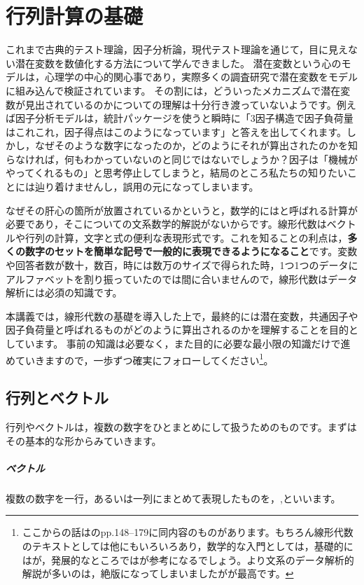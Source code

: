 \documentclass{ltjsbook}
\begin{document}
 
\chapter{行列計算の基礎} 
\label{chapter6} 
これまで古典的テスト理論，因子分析論，現代テスト理論を通じて，目に見えない潜在変数を数値化する方法について学んできました。
潜在変数という心のモデルは，心理学の中心的関心事であり，実際多くの調査研究で潜在変数をモデルに組み込んで検証されています。
その割には，どういったメカニズムで潜在変数が見出されているのかについての理解は十分行き渡っていないようです。例えば因子分析モデルは，統計パッケージを使うと瞬時に「3因子構造で因子負荷量はこれこれ，因子得点はこのようになっています」と答えを出してくれます。しかし，なぜそのような数字になったのか，どのようにそれが算出されたのかを知らなければ，何もわかっていないのと同じではないでしょうか？因子は「機械がやってくれるもの」と思考停止してしまうと，結局のところ私たちの知りたいことには辿り着けませんし，誤用の元になってしまいます。

なぜその肝心の箇所が放置されているかというと，数学的にはと呼ばれる計算が必要であり，そこについての文系数学的解説がないからです。線形代数はベクトルや行列の計算，文字と式の便利な表現形式です。これを知ることの利点は，\textbf{多くの数字のセットを簡単な記号で一般的に表現できるようになること}です。変数や回答者数が数十，数百，時には数万のサイズで得られた時，1つ1つのデータにアルファベットを割り振っていたのでは間に合いませんので，線形代数はデータ解析には必須の知識です。

本講義では，線形代数の基礎を導入した上で，最終的には潜在変数，共通因子や因子負荷量と呼ばれるものがどのように算出されるのかを理解することを目的としています。
事前の知識は必要なく，また目的に必要な最小限の知識だけで進めていきますので，一歩ずつ確実にフォローしてください\footnote{ここからの話は\citet{kosugi2018}のpp.148--179に同内容のものがあります。もちろん線形代数のテキストとしては他にもいろいろあり，数学的な入門としては，基礎的には\citet{村上正康2016-03-01}が，発展的なところでは\citet{永田靖2005-04-01}が参考になるでしょう。より文系のデータ解析的解説が多いのは，絶版になってしまいましたが\citet{岡太彬訓2008-04-09}が最高です。}。


\section{行列とベクトル}
行列やベクトルは，複数の数字をひとまとめにして扱うためのものです。まずはその基本的な形からみていきます。

\paragraph{ベクトル}
複数の数字を一行，あるいは一列にまとめて表現したものを，,といいます。
\end{document}

